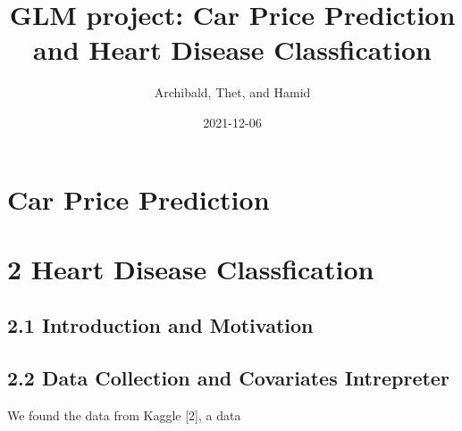 \documentclass[
]{article}
\title{GLM project: Car Price Prediction and Heart Disease
Classfication}
\author{Archibald, Thet, and Hamid}
\date{2021-12-06}
\begin{document}
\maketitle

\pagebreak

\hypertarget{car-price-prediction}{%
\section{Car Price Prediction}\label{car-price-prediction}}

\hypertarget{heart-disease-classfication}{%
\section{2 Heart Disease
Classfication}\label{heart-disease-classfication}}

\hypertarget{introduction-and-motivation}{%
\subsection{2.1 Introduction and
Motivation}\label{introduction-and-motivation}}

\hypertarget{data-collection-and-covariates-intrepreter}{%
\subsection{2.2 Data Collection and Covariates
Intrepreter}\label{data-collection-and-covariates-intrepreter}}

We found the data from Kaggle {[}2{]}, a data
\end{document}
